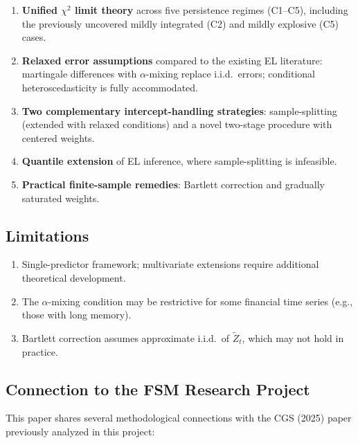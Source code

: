 \documentclass[11pt,a4paper]{article}
\theoremstyle{definition}
\theoremstyle{remark}
\begin{document}
\begin{enumerate}[leftmargin=*]
    \item \textbf{Unified $\chi^2$ limit theory} across five persistence regimes
    (C1--C5), including the previously uncovered mildly integrated (C2)
    and mildly explosive (C5) cases.
    \item \textbf{Relaxed error assumptions} compared to the existing EL literature:
    martingale differences with $\alpha$-mixing replace i.i.d.\ errors;
    conditional heteroscedasticity is fully accommodated.
    \item \textbf{Two complementary intercept-handling strategies}:
    sample-splitting (extended with relaxed conditions) and
    a novel two-stage procedure with centered weights.
    \item \textbf{Quantile extension} of EL inference,
    where sample-splitting is infeasible.
    \item \textbf{Practical finite-sample remedies}:
    Bartlett correction and gradually saturated weights.
\end{enumerate}

\subsection*{Limitations}

\begin{enumerate}[leftmargin=*]
    \item Single-predictor framework; multivariate extensions require
    additional theoretical development.
    \item The $\alpha$-mixing condition may be restrictive for some financial time series
    (e.g., those with long memory).
    \item Bartlett correction assumes approximate i.i.d.\ of $\widetilde{Z}_t$,
    which may not hold in practice.
\end{enumerate}

\subsection*{Connection to the FSM Research Project}

This paper shares several methodological connections with
the CGS (2025) paper previously analyzed in this project:
\end{document}
